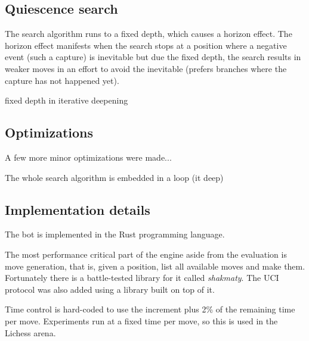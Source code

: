 \subsection{Quiescence search}

The search algorithm runs to a fixed depth, which causes a horizon effect. The horizon effect manifests when the search stops at a position where a negative event (such a capture) is inevitable but due the fixed depth, the search results in weaker moves in an effort to avoid the inevitable (prefers branches where the capture has not happened yet).



fixed depth in iterative deepening

\subsection{Optimizations}

A few more minor optimizations were made...

The whole search algorithm is embedded in a loop (it deep)




\subsection{Implementation details}

The bot is implemented in the Rust programming language.

The most performance critical part of the engine aside from the evaluation is move generation, that is, given a position, list all available moves and make them.
Fortunately there is a battle-tested library for it called \textit{shakmaty}. The UCI protocol was also added using a library built on top of it.

Time control is hard-coded to use the increment plus 2\% of the remaining time per move. Experiments run at a fixed time per move, so this is used in the Lichess arena.


